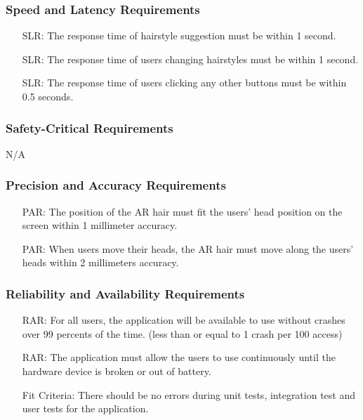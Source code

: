 \documentclass[12pt]{article}
\newcounter{reqnum} %
\newcounter{arreqnum} %
\newcounter{lrreqnum} %
\newcounter{slrreqnum} %
\newcounter{parreqnum} %
\newcounter{rarreqnum} %
\begin{document}
\subsubsection{Speed and Latency Requirements}
\begin{itemize}
    \item[SLR\refstepcounter{slrreqnum}\theslrreqnum \label{R_Inputs}:] The response time of hairstyle suggestion must be within 1 second.
    \item[SLR\refstepcounter{slrreqnum}\theslrreqnum \label{R_Inputs}:] The response time of users changing hairstyles must be within 1 second.
    \item[SLR\refstepcounter{slrreqnum}\theslrreqnum \label{R_Inputs}:] The response time of users clicking any other buttons must be within 0.5 seconds.
\end{itemize}

\subsubsection{Safety-Critical Requirements}
N/A

\subsubsection{Precision and Accuracy Requirements}
\begin{itemize}
    \item[PAR\refstepcounter{parreqnum}\theparreqnum \label{R_Inputs}:] The position of the AR hair must fit the users' head position on the screen within 1 millimeter accuracy.
    \item[PAR\refstepcounter{parreqnum}\theparreqnum \label{R_Inputs}:] When users move their heads, the AR hair must move along the users' heads within 2 millimeters accuracy.
\end{itemize}

\subsubsection{Reliability and Availability Requirements}
\begin{itemize}
    \item[RAR\refstepcounter{rarreqnum}\therarreqnum \label{R_Inputs}:] For all users, the application will be available to use without crashes over 99 percents of the time. (less than or equal to 1 crash per 100 access)
    \item[RAR\refstepcounter{rarreqnum}\therarreqnum \label{R_Inputs}:] The application must allow the users to use continuously until the hardware device is broken or out of battery. 
    \item[] Fit Criteria: There should be no errors during unit tests, integration test and user tests for the application.
\end{itemize}
\end{document}
